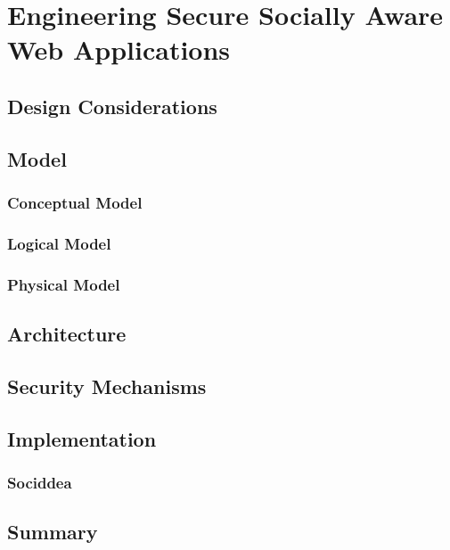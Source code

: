 \chapter{Engineering Secure Socially Aware Web Applications}
\label{chap:architecture}

\section{Design Considerations}
\section{Model}
\subsection{Conceptual Model}
\subsection{Logical Model}

\subsection{Physical Model}
\section{Architecture}


\section{Security Mechanisms}


\subsection{}
\subsection{}
\subsection{}
\section{Implementation}
\subsection{Sociddea}
\section{Summary}